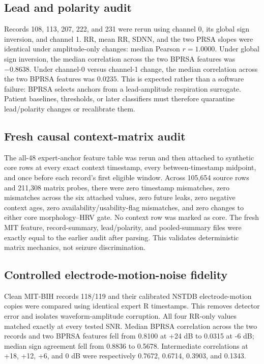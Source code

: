 \documentclass[11pt,a4paper]{article}
\begin{document}
\subsection{Lead and polarity audit}

Records 108, 113, 207, 222, and 231 were rerun using channel 0, its global
sign inversion, and channel 1. RR, mean RR, SDNN, and the two PRSA slopes were
identical under amplitude-only changes: median Pearson $r=1.0000$. Under
global sign inversion, the median correlation across the two BPRSA features
was $-0.8638$. Under channel-0 versus channel-1 change, the median correlation
across the two BPRSA features was $0.0235$. This is expected rather than a
software failure: BPRSA selects anchors from a lead-amplitude respiration
surrogate. Patient baselines, thresholds, or later classifiers must therefore
quarantine lead/polarity changes or recalibrate them.

\subsection{Fresh causal context-matrix audit}

The all-48 expert-anchor feature table was rerun and then attached to synthetic
core rows at every exact context timestamp, every between-timestamp midpoint,
and once before each record's first eligible window. Across 105,654 source
rows and 211,308 matrix probes, there were zero timestamp mismatches, zero
mismatches across the six attached values, zero future leaks, zero negative
context ages, zero availability/usability-flag mismatches, and zero changes to
either core morphology--HRV gate. No context row was marked as core. The fresh
MIT feature, record-summary, lead/polarity, and pooled-summary files were
exactly equal to the earlier audit after parsing. This validates deterministic
matrix mechanics, not seizure discrimination.

\subsection{Controlled electrode-motion-noise fidelity}

Clean MIT-BIH records 118/119 and their calibrated NSTDB electrode-motion
copies were compared using identical expert R timestamps. This removes
detector error and isolates waveform-amplitude corruption. All four RR-only
values matched exactly at every tested SNR. Median BPRSA correlation across
the two records and two BPRSA features fell from 0.8100 at +24 dB to 0.0315
at -6 dB; median sign agreement fell from 0.8836 to 0.5678. Intermediate
correlations at +18, +12, +6, and 0 dB were respectively 0.7672, 0.6714,
0.3903, and 0.1343.
\end{document}
